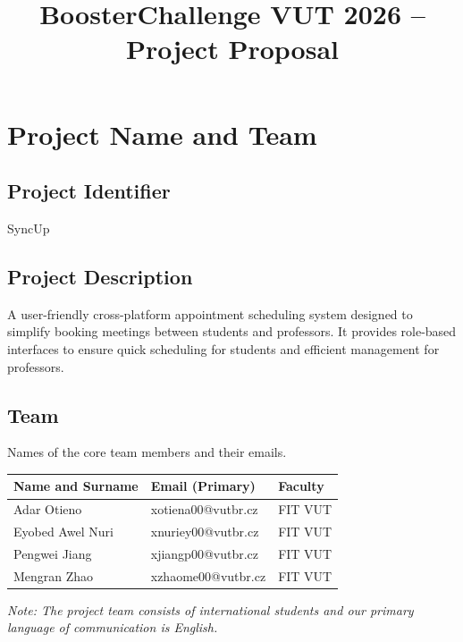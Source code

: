 \documentclass[12pt,a4paper]{article}
\title{\vspace{-2cm}\textbf{BoosterChallenge VUT 2026 -- Project Proposal}}
\author{}
\date{}
\begin{document}
\maketitle
\vspace{-1.5cm}


\tableofcontents

\vspace{1cm}

\section{Project Name and Team}

\subsection*{Project Identifier}
SyncUp

\subsection*{Project Description}
A user-friendly cross-platform appointment scheduling system designed to simplify booking meetings between students and professors. It provides role-based interfaces to ensure quick scheduling for students and efficient management for professors.

\subsection*{Team}
Names of the core team members and their emails. 

\vspace{0.5cm}
\begin{center}
\renewcommand{\arraystretch}{1.5}
\begin{tabularx}{\textwidth}{|X|X|X|}
\hline
\textbf{Name and Surname} & \textbf{Email (Primary)} & \textbf{Faculty} \\
\hline
Adar Otieno & xotiena00@vutbr.cz & FIT VUT \\
\hline
Eyobed Awel Nuri & xnuriey00@vutbr.cz & FIT VUT \\
\hline
Pengwei Jiang & xjiangp00@vutbr.cz & FIT VUT \\
\hline
Mengran Zhao & xzhaome00@vutbr.cz & FIT VUT \\
\hline
\end{tabularx}
\end{center}

\vspace{0.2cm}
\noindent
\textit{Note: The project team consists of international students and our primary language of communication is English.}
\end{document}
